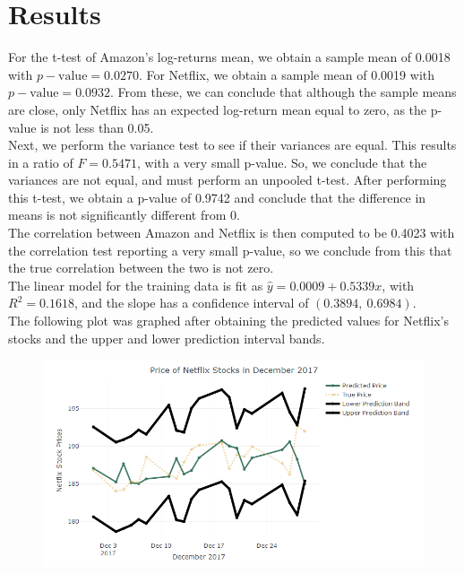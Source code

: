 \documentclass[12pt]{article}
\begin{document}
\section*{Results}
For the t-test of Amazon's log-returns mean, we obtain a sample mean of 0.0018 with $p-\text{value} = 0.0270$. For Netflix, we obtain a sample mean of 0.0019 with $p-\text{value} = 0.0932$. From these, we can conclude that although the sample means are close, only Netflix has an expected log-return mean equal to zero, as the p-value is not less than 0.05.
\\Next, we perform the variance test to see if their variances are equal. This results in a ratio of $F = 0.5471$, with a very small p-value. So, we conclude that the variances are not equal, and must perform an unpooled t-test. After performing this t-test, we obtain a p-value of 0.9742 and conclude that the difference in means is not significantly different from 0.
\\The correlation between Amazon and Netflix is then computed to be 0.4023 with the correlation test reporting a very small p-value, so we conclude from this that the true correlation between the two is not zero.
\\The linear model for the training data is fit as $\hat{y}=0.0009 + 0.5339x$, with  $R^2 = 0.1618$, and the slope has a confidence interval of $(0.3894,~0.6984)$.
\\The following plot was graphed after obtaining the predicted values for Netflix's stocks and the upper and lower prediction interval bands.
\begin{figure}[h]
	\begin{center}
		\includegraphics*[scale=.8]{netflix_stock_plot.png}
	\end{center}
\end{figure}
\end{document}
